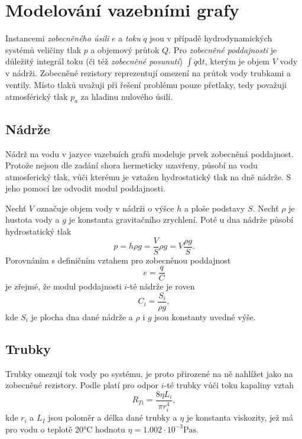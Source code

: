 \documentclass[twoside]{article}
\begin{document}
\section{Modelování vazebními grafy}

Instancemi \textit{zobecněného úsili} $e$ a \textit{toku} $\dot{q}$ jsou v případě hydrodynamických systémů veličiny tlak $p$ a objemový průtok $Q$.
Pro \textit{zobecněné poddajnosti} je důležitý integrál toku (či též \textit{zobecněné posunutí}) $\int \dot{q} \text{d}t$,
kterým je objem $V$ vody v nádrži. Zobecněné rezistory reprezentují omezení na průtok vody trubkami a ventily.
Místo tlaků uvažuji při řešení problému pouze přetlaky, tedy považuji atmosférický tlak $p_a$ za hladinu nulového úsilí.

\subsection{Nádrže}

Nádrž na vodu v jazyce vazebních grafů modeluje prvek zobecněná poddajnost. Protože nejsou dle zadání shora hermeticky uzavřeny, působí
na vodu atmosferický tlak, vůči kterému je vztažen hydrostatický tlak na dně nádrže. S jeho pomocí lze odvodit modul poddajnosti.

Nechť $V$ označuje objem vody v nádrži o výšce $h$ a ploše podstavy $S$. Nechť $\rho$ je hustota vody
a $g$ je konstanta gravitačního zrychlení. Poté u dna nádrže působí hydrostatický tlak
\begin{equation}
    p = h \rho g = \frac{V}{S} \rho g = V \frac{\rho g}{S}.
\end{equation}
Porovnáním s definičním vztahem pro zobecněnou poddajnost
\begin{equation}
    e = \frac{q}{C}
\end{equation}
je zřejmé, že modul poddajnosti $i$-té nádrže je roven
\begin{equation}
    C_i = \frac{S_i}{\rho g},
    \label{eq:poddajnost}
\end{equation}
kde $S_i$ je plocha dna dané nádrže a $\rho$ i $g$ jsou konstanty uvedné výše.

\subsection{Trubky}

Trubky omezují tok vody po systému, je proto přirozené na ně nahlížet jako na zobecněné rezistory.
Podle \cite{odpor_trubky} platí pro odpor $i$-té trubky vůči toku kapaliny vztah
\begin{equation}
    R_{Ti} = \frac{8\eta L_i}{\pi r_i^4},
    \label{eq:odpor_trubky}
\end{equation}
kde $r_i$ a $L_I$ jsou poloměr a délka dané trubky a $\eta$ je konstanta viskozity,
jež má pro vodu o teplotě 20°C hodnotu $\eta = 1.002 \cdot 10^{-3} \si{\pascal \second}$.
\end{document}

